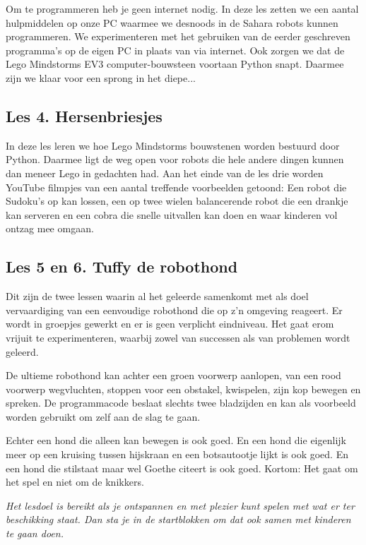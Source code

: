 \documentclass[a4paper,11pt]{article}
\begin{document}
Om te programmeren heb je geen internet nodig.
In deze les zetten we een aantal hulpmiddelen op onze PC waarmee we desnoods in de Sahara robots kunnen programmeren.
We experimenteren met het gebruiken van de eerder geschreven programma's op de eigen PC in plaats van via internet.
Ook zorgen we dat de Lego Mindstorms EV3 computer-bouwsteen voortaan Python snapt.
Daarmee zijn we klaar voor een sprong in het diepe...

\subsection*{Les 4. Hersenbriesjes}

In deze les leren we hoe Lego Mindstorms bouwstenen worden bestuurd door Python.
Daarmee ligt de weg open voor robots die hele andere dingen kunnen dan meneer Lego in gedachten had.
Aan het einde van de les drie worden YouTube filmpjes van een aantal treffende voorbeelden getoond:
Een robot die Sudoku's op kan lossen, een op twee wielen balancerende robot die een drankje kan serveren en een cobra die snelle uitvallen kan doen en waar kinderen vol ontzag mee omgaan.

\subsection*{Les 5 en 6. Tuffy de robothond}

Dit zijn de twee lessen waarin al het geleerde samenkomt met als doel vervaardiging van een eenvoudige robothond die op z'n omgeving reageert.
Er wordt in groepjes gewerkt en er is geen verplicht eindniveau.
Het gaat erom vrijuit te experimenteren, waarbij zowel van successen als van problemen wordt geleerd.

De ultieme robothond kan achter een groen voorwerp aanlopen, van een rood voorwerp wegvluchten, stoppen voor een obstakel, kwispelen, zijn kop bewegen en spreken.
De programmacode beslaat slechts twee bladzijden en kan als voorbeeld worden gebruikt om zelf aan de slag te gaan.

Echter een hond die alleen kan bewegen is ook goed.
En een hond die eigenlijk meer op een kruising tussen hijskraan en een botsautootje lijkt is ook goed.
En een hond die stilstaat maar wel Goethe citeert is ook goed.
Kortom: Het gaat om het spel en niet om de knikkers.

\emph{Het lesdoel is bereikt als je ontspannen en met plezier kunt spelen met wat er ter beschikking staat.
Dan sta je in de startblokken om dat ook samen met kinderen te gaan doen.}
\end{document}
